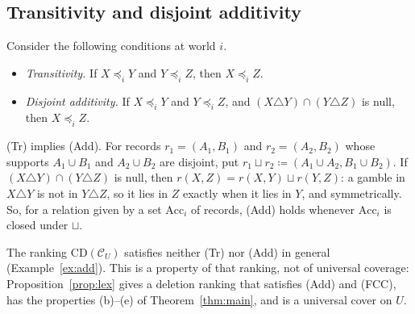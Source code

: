 \documentclass[11pt]{article}
\newcommand{\CC}{\mathcal{C}}
\newcommand{\CD}{\mathrm{CD}}
\newcommand{\Acc}{\mathrm{Acc}}
\theoremstyle{plain}
\theoremstyle{definition}
\theoremstyle{remark}
\begin{document}
\subsection{Transitivity and disjoint additivity}

Consider the following conditions at world $i$.
\begin{itemize}
  \item[(Tr)] \emph{Transitivity.} If $X\preceq_iY$ and $Y\preceq_iZ$, then $X\preceq_iZ$.
  \item[(Add)] \emph{Disjoint additivity.} If $X\preceq_iY$ and $Y\preceq_iZ$, and
  $(X\triangle Y)\cap(Y\triangle Z)$ is null, then $X\preceq_iZ$.
\end{itemize}
(Tr) implies (Add). For records $r_1=(A_1,B_1)$ and $r_2=(A_2,B_2)$ whose supports
$A_1\cup B_1$ and $A_2\cup B_2$ are disjoint, put $r_1\sqcup r_2\coloneqq(A_1\cup A_2,
B_1\cup B_2)$. If $(X\triangle Y)\cap(Y\triangle Z)$ is null, then $r(X,Z)=r(X,Y)\sqcup
r(Y,Z)$: a gamble in $X\triangle Y$ is not in $Y\triangle Z$, so it lies in $Z$ exactly
when it lies in $Y$, and symmetrically. So, for a relation given by a set $\Acc_i$ of
records, (Add) holds whenever $\Acc_i$ is closed under $\sqcup$.

The ranking $\CD(\CC_U)$ satisfies neither (Tr) nor (Add) in general
(Example~\ref{ex:add}). This is a property of that ranking, not of universal coverage:
Proposition~\ref{prop:lex} gives a deletion ranking that satisfies (Add) and (FCC), has
the properties (b)--(e) of Theorem~\ref{thm:main}, and is a universal cover on $U$.
\end{document}
